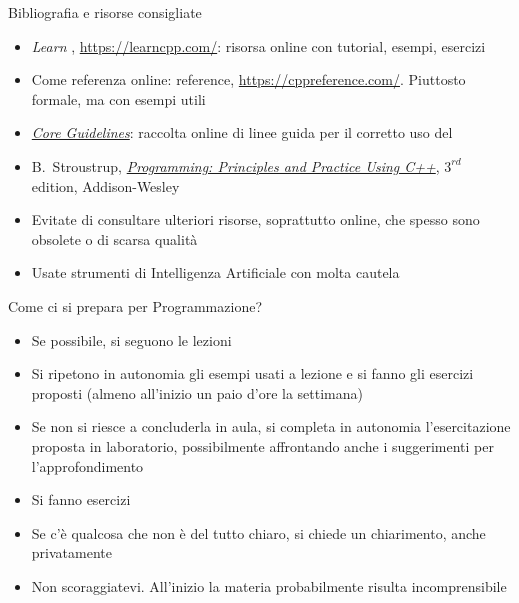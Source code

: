 \begin{frame}{Bibliografia e risorse consigliate}

  \begin{itemize}

  \item \textit{Learn \Cpp{}}, \url{https://learncpp.com/}: risorsa online con
    tutorial, esempi, esercizi

  \item Come referenza online: \Cpp{} reference,
    \url{https://cppreference.com/}. Piuttosto formale, ma con esempi utili

  \item
    \href{https://isocpp.github.io/CppCoreGuidelines/CppCoreGuidelines}{\textit{\Cpp{}
        Core Guidelines}}: raccolta online di linee guida per il corretto uso
    del \Cpp{}

  \item B.~Stroustrup,
    \href{https://stroustrup.com/programming.html}{\textit{Programming:
        Principles and Practice Using C++}}, $3^{rd}$ edition, Addison-Wesley

  \end{itemize}

  \begin{itemize}
  \item Evitate di consultare ulteriori risorse, soprattutto online, che spesso
    sono obsolete o di scarsa qualità
  \item Usate strumenti di Intelligenza Artificiale con molta cautela
  \end{itemize}

\end{frame}

\begin{frame}{Come ci si prepara per Programmazione?}

  \begin{itemize}
  \item Se possibile, si seguono le lezioni
  \item Si ripetono in autonomia gli esempi usati a lezione e si fanno gli
    esercizi proposti (almeno all'inizio un paio d'ore la settimana)
  \item Se non si riesce a concluderla in aula, si completa in
    autonomia l'esercitazione proposta in laboratorio, possibilmente
    affrontando anche i suggerimenti per l'approfondimento
  \item Si fanno esercizi
  \item Se c'è qualcosa che non è del tutto chiaro, si chiede un
    chiarimento, anche privatamente
  \item Non scoraggiatevi. All'inizio la materia probabilmente risulta
    incomprensibile
  \end{itemize}

\end{frame}

